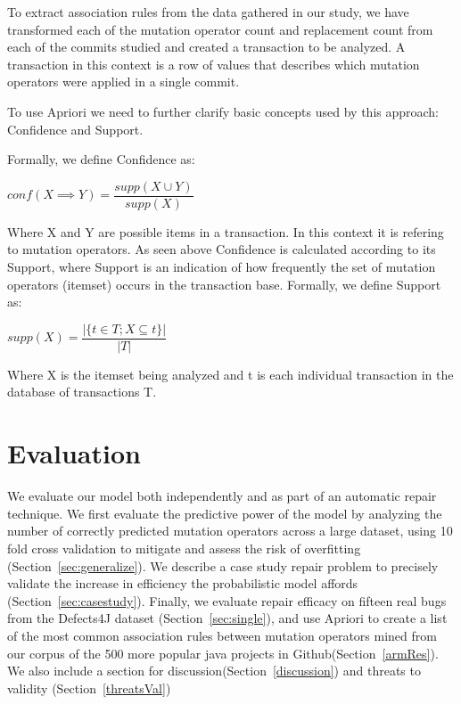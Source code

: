 \documentclass[conference]{IEEEtran}
\begin{document}
To extract association rules from the data gathered in our study, we 
have transformed each of the mutation operator count and replacement count from 
each of the commits studied and created a transaction to be analyzed. A transaction 
in this context is a row of values that describes which mutation operators were applied in a single commit.

To use Apriori we need to further clarify basic concepts used by this approach: Confidence and Support.

Formally, we define Confidence as:

\begin{center}
$conf(X \implies Y) = \dfrac{supp(X \cup Y)}{supp(X)}$ 
\end{center}

Where X and Y are possible items in a transaction. In this context it is refering to
 mutation operators. As seen above Confidence is calculated according to its Support, 
 where Support is an indication of how frequently the set of mutation operators (itemset) 
 occurs in the transaction base.
Formally, we define Support as:

\begin{center}
$supp(X) = \dfrac{|\{t \in T; X \subseteq t\}|}{|T|}$
\end{center}

Where X is the itemset being analyzed and t is each individual transaction in the database of transactions T. 

\section{Evaluation} \label{evaluation}

We evaluate our model both independently and as part of an automatic repair
technique.  We first evaluate the predictive power of the model by analyzing the
number of correctly predicted mutation operators across a large dataset, using 10 fold cross
validation to mitigate and assess the risk of overfitting
(Section~\ref{sec:generalize}). We describe a case study 
repair problem to precisely validate the increase in efficiency the
probabilistic model affords (Section~\ref{sec:casestudy}).  Finally, we evaluate
repair efficacy on fifteen real bugs from the Defects4J dataset
(Section~\ref{sec:single}), and use Apriori to create a list of the most common 
association rules between mutation operators mined from our corpus of the 500 more
 popular java projects in Github(Section~\ref{armRes}). We also include a section for 
discussion(Section~\ref{discussion}) and threats to validity (Section~\ref{threatsVal}) 
\end{document}
